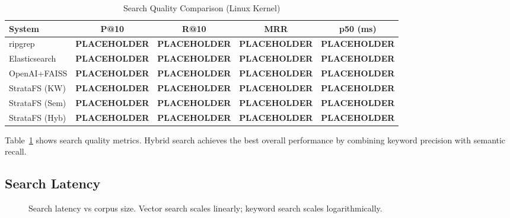 \documentclass[conference]{IEEEtran}
\begin{document}
\begin{table}[htbp]
\caption{Search Quality Comparison (Linux Kernel)}
\begin{center}
\begin{tabular}{lcccc}
\toprule
\textbf{System} & \textbf{P@10} & \textbf{R@10} & \textbf{MRR} & \textbf{p50 (ms)} \\
\midrule
ripgrep & \textbf{PLACEHOLDER} & \textbf{PLACEHOLDER} & \textbf{PLACEHOLDER} & \textbf{PLACEHOLDER} \\
Elasticsearch & \textbf{PLACEHOLDER} & \textbf{PLACEHOLDER} & \textbf{PLACEHOLDER} & \textbf{PLACEHOLDER} \\
OpenAI+FAISS & \textbf{PLACEHOLDER} & \textbf{PLACEHOLDER} & \textbf{PLACEHOLDER} & \textbf{PLACEHOLDER} \\
StrataFS (KW) & \textbf{PLACEHOLDER} & \textbf{PLACEHOLDER} & \textbf{PLACEHOLDER} & \textbf{PLACEHOLDER} \\
StrataFS (Sem) & \textbf{PLACEHOLDER} & \textbf{PLACEHOLDER} & \textbf{PLACEHOLDER} & \textbf{PLACEHOLDER} \\
StrataFS (Hyb) & \textbf{PLACEHOLDER} & \textbf{PLACEHOLDER} & \textbf{PLACEHOLDER} & \textbf{PLACEHOLDER} \\
\bottomrule
\end{tabular}
\label{tab:quality}
\end{center}
\end{table}

Table~\ref{tab:quality} shows search quality metrics. Hybrid search achieves the best overall performance by combining keyword precision with semantic recall.

\subsection{Search Latency}

\begin{figure}[htbp]
\centering
{}
\caption{Search latency vs corpus size. Vector search scales linearly; keyword search scales logarithmically.}
\label{fig:latency}
\end{figure}
\end{document}
